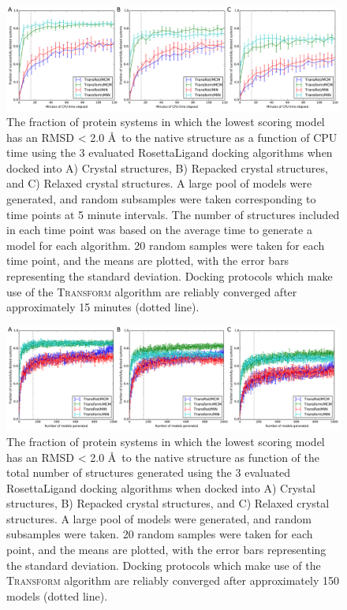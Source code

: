 \begin{figure}
\centering
\includegraphics[width=6in]{figures/lowres/fraction_successful_time.pdf}
\caption{
The fraction of protein systems in which the lowest scoring model has an RMSD < 2.0 \AA\ to the native structure as a function of \acs{CPU} time using the 3 evaluated RosettaLigand docking algorithms when docked into A) Crystal structures, B) Repacked crystal structures, and C) Relaxed crystal structures.
A large pool of models were generated, and random subsamples were taken corresponding to time points at 5 minute intervals.
The number of structures included in each time point was based on the average time to generate a model for each algorithm.
20 random samples were taken for each time point, and the means are plotted, with the error bars representing the standard deviation.
Docking protocols which make use of the \textsc{Transform}  algorithm are reliably converged after approximately 15 minutes (dotted line).
}
\label{fig:fraction_successful_time}
\end{figure}

\begin{figure}
\centering
\includegraphics[width=6in]{figures/lowres/fraction_successful_count.pdf}
\caption{
The fraction of protein systems in which the lowest scoring model has an \acs{RMSD} < 2.0 \AA\ to the native structure as function of the total number of structures generated using the 3 evaluated RosettaLigand docking algorithms when docked into A) Crystal structures, B) Repacked crystal structures, and C) Relaxed crystal structures.
A large pool of models were generated, and random subsamples were taken.  20 random samples were taken for each point, and the means are plotted, with the error bars representing the standard deviation.
Docking protocols which make use of the \textsc{Transform} algorithm are reliably converged after approximately 150 models (dotted line).
}
\label{fig:fraction_successful_count}
\end{figure}

